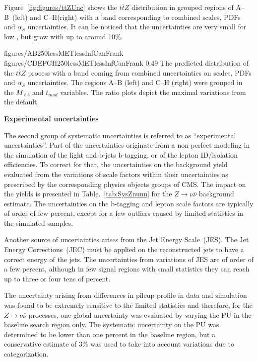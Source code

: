 Figure~\ref{fig:figures/ttZUnc} shows the $t\bar{t}Z$ \MET distribution in grouped regions of A--B~(left) and C--H(right) with a band corresponding to combined scales, PDFs and $\alpha_{S}$ uncertainties. It can be noticed that the uncertainties are very small for low \MET, but grow with \MET up to around 10\%.

                 {figures/AB250lessMETlessInfCanFrank} %
                 {figures/CDEFGH250lessMETlessInfCanFrank} %
                 {0.49}       %
                 { The predicted \MET distribution of the $t\bar{t}Z$ process with a band coming from combined uncertainties on scales, PDFs and $\alpha_{S}$ uncertainties. The regions A--B (left) and C--H (right) were grouped in the $M_{\ell b}$ and $t_{mod}$ variables. The ratio plots depict the maximal variations from the default. }

\textbf{Experimental uncertainties}

The second group of systematic uncertainties is referred to as ``experimental uncertainties''. Part of the uncertainties originate from a non-perfect modeling in the simulation of the light and b-jets b-tagging, or of the lepton ID/isolation efficiencies. To correct for that, the uncertainties on the background yield evaluated from the variations of scale factors within their uncertainties as prescribed by the corresponding physics objects groups of CMS. The impact on the yields is presented in Table.~\ref{tab:SysZnunu} for the $Z \to \nu \bar{\nu}$ background estimate. The uncertainties on the b-tagging and lepton scale factors are typically of order of few percent, except for a few outliers caused by limited statistics in the simulated samples.

Another source of uncertainties arises from the Jet Energy Scale~(JES). The Jet Energy Corrections~(JEC) must be applied on the reconstructed jets to have a correct energy of the jets. The uncertainties from variations of JES are of order of a few percent, although in few signal regions with small statistics they can reach up to three or four tens of percent. 

The uncertainty arising from differences in pileup profile in data and simulation was found to be extremely sensitive to the limited statistics and therefore, for the $Z \to  \nu \bar{\nu}$ processes, one global uncertainty was evaluated by varying the PU in the baseline search region only. The systematic uncertainty on the PU was determined to be lower than one percent in the baseline region, but a conservative estimate of 3\% was used to take into account variations due to categorization. 

